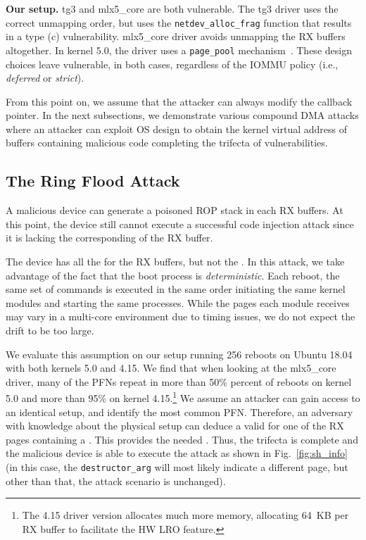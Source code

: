 \smallskip
\noindent\textbf{Our setup.} tg3 and mlx5\_core are both vulnerable. The tg3 driver uses the correct unmapping order, but uses the \texttt{netdev\_alloc\_frag} function that results in a type (c) \subpage{} vulnerability. mlx5\_core driver avoids unmapping the RX buffers altogether. In kernel 5.0, the driver uses a \texttt{page\_pool} mechanism~\cite{page_pool}. These design choices leave \shinfo{} vulnerable, in both cases, regardless of the IOMMU policy (i.e., \emph{deferred} or \emph{strict}).


From this point on, we assume that the attacker can always modify the callback pointer. In the next subsections, we demonstrate various compound DMA attacks where an attacker can exploit OS design to obtain the kernel virtual address of buffers containing malicious code completing the trifecta of vulnerabilities.

\subsection{The Ring Flood \Compound{} Attack}\label{sec:ringflod}
A malicious device can generate a poisoned ROP stack in each RX buffers. At this point, the device still cannot execute a successful code injection attack since it is lacking the corresponding \kva of the RX buffer.

The device has all the \iova{} for the RX buffers, but not the \kva{}. In this attack, we take advantage of the fact that the boot process is \emph{deterministic}. Each reboot, the same set of commands is executed in the same order initiating the same kernel modules and starting the same processes. While the pages each module receives may vary in a multi-core environment due to timing issues, we do not expect the drift to be too large. 

We evaluate this assumption on our setup running 256 reboots on Ubuntu 18.04 with both kernels 5.0 and 4.15.
We find that when looking at the mlx5\_core driver, many of the PFNs repeat in more than 50\% percent of reboots on kernel 5.0 and more than 95\% on kernel 4.15.\footnote{The 4.15 driver version allocates much more memory, allocating 64~KB per RX buffer to facilitate the HW LRO feature.} We assume an attacker can gain access to an identical setup, and identify the most common PFN. Therefore, an adversary with knowledge about the physical setup can deduce a valid \kva{} for one of the RX pages containing a \mabaf. This provides the needed \kva. Thus, the trifecta is complete and the malicious device is able to execute the attack as shown in Fig.~\ref{fig:sh_info} (in this case, the \texttt{destructor\_arg} will most likely indicate a different page, but other than that, the attack scenario is unchanged).


